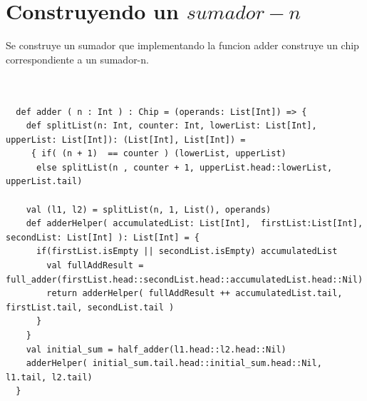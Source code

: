 \documentclass[12pt, a4paper]{article}
\begin{document}
  \section{Construyendo un $sumador-n$}
  Se construye un sumador que implementando la funcion adder construye un chip correspondiente a un sumador-n.
  \begin{lstlisting}[style=scalaStyle, caption=sumador-n.]
 

  def adder ( n : Int ) : Chip = (operands: List[Int]) => {
    def splitList(n: Int, counter: Int, lowerList: List[Int], upperList: List[Int]): (List[Int], List[Int]) =
     { if( (n + 1)  == counter ) (lowerList, upperList)
      else splitList(n , counter + 1, upperList.head::lowerList, upperList.tail)

    val (l1, l2) = splitList(n, 1, List(), operands)  
    def adderHelper( accumulatedList: List[Int],  firstList:List[Int],  secondList: List[Int] ): List[Int] = {
      if(firstList.isEmpty || secondList.isEmpty) accumulatedList     
        val fullAddResult = full_adder(firstList.head::secondList.head::accumulatedList.head::Nil) 
        return adderHelper( fullAddResult ++ accumulatedList.tail, firstList.tail, secondList.tail ) 
      }
    }
    val initial_sum = half_adder(l1.head::l2.head::Nil) 
    adderHelper( initial_sum.tail.head::initial_sum.head::Nil, l1.tail, l2.tail) 
  }
  \end{lstlisting}
\end{document}
